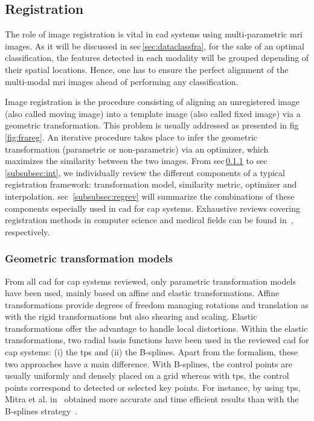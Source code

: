 \subsection{Registration} \label{subsec:registration}

The role of image registration is vital in \ac{cad} systems using multi-parametric \ac{mri} images. As it will be discussed in \ac{sec}\,\ref{sec:dataclassfra}, for the sake of an optimal classification, the features detected in each modality will be grouped depending of their spatial locations. Hence, one has to ensure the perfect alignment of the multi-modal \ac{mri} images ahead of performing any classification.

Image registration is the procedure consisting of aligning an unregistered image (also called moving image) into a template image (also called fixed image) via a geometric transformation. This problem is usually addressed as presented in \ac{fig}\,\ref{fig:frareg}. An iterative procedure takes place to infer the geometric transformation (parametric or non-parametric) via an optimizer, which maximizes the similarity between the two images. From \ac{sec}\,\ref{subsubsec:geotra} to \ac{sec}\,\ref{subsubsec:int}, we individually review the different components of a typical registration framework: transformation model, similarity metric, optimizer and interpolation. \Acl{sec}~\ref{subsubsec:regrev} will summarize the combinations of these components especially used in \ac{cad} for \ac{cap} systems. Exhaustive reviews covering registration methods in computer science and medical fields can be found in~\cite{Maintz1998,Zitova2003}, respectively.

\subsubsection{Geometric transformation models}\label{subsubsec:geotra}

From all \ac{cad} for \ac{cap} systems reviewed, only parametric transformation models have been used, mainly based on affine and elastic transformations. Affine transformations provide degrees of freedom managing rotations and translation as with the rigid transformations but also shearing and scaling. Elastic transformations offer the advantage to handle local distortions. Within the elastic transformations, two radial basis functions have been used in the reviewed \ac{cad} for \ac{cap} systems: (i) the \ac{tps} and (ii) the B-splines. Apart from the formalism, these two approaches have a main difference. With B-splines, the control points are usually uniformly and densely placed on a grid whereas with \ac{tps}, the control points correspond to detected or selected key points. For instance, by using \ac{tps}, Mitra et al. in~\cite{Mitra2011} obtained more accurate and time efficient results than with the B-splines strategy~\cite{Mitra2012a}.

